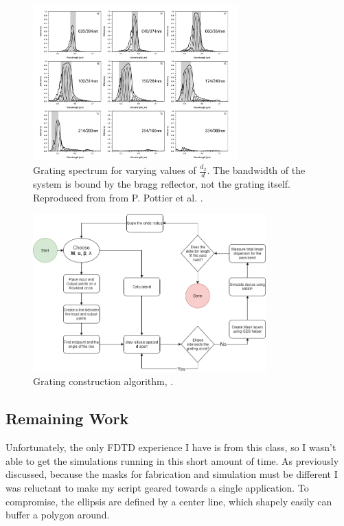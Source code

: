 \documentclass{article}
\begin{document}
    \begin{figure}[H]        
    \centering
    \scriptsize 
    \includegraphics[width=0.7\textwidth]{images/ref_simulation.png}
    \caption{\label{fig:ref_spec} Grating spectrum for varying values of $\frac{d_2}{d}$. The bandwidth of the system is bound by the bragg reflector, not the grating itself. Reproduced from from P. Pottier et al. \cite{Packirisamy2012Mono-OrderGrating}.}
    \end{figure}

    \begin{figure}[H]        
    \centering
    \scriptsize 
    \includegraphics[width=0.8\textwidth]{images/grating_algorithm.png}
    \caption{\label{fig:alg} Grating construction algorithm, .}
    \end{figure}
    
    \subsection{Remaining Work}
    Unfortunately, the only FDTD experience I have is from this class, so I wasn't able to get the simulations running in this short amount of time. As previously discussed, because the masks for fabrication and simulation must be different I was reluctant to make my script geared towards a single application. To compromise, the ellipsis are defined by a center line, which shapely easily can buffer a polygon around. 
    
\end{document}
